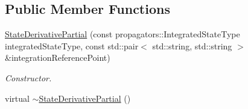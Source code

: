 \subsection*{Public Member Functions}
\begin{DoxyCompactItemize}
\item 
\hyperlink{classtudat_1_1orbit__determination_1_1StateDerivativePartial_a4827d172b38b466f65f4da68500f53ea}{State\+Derivative\+Partial} (const propagators\+::\+Integrated\+State\+Type integrated\+State\+Type, const std\+::pair$<$ std\+::string, std\+::string $>$ \&integration\+Reference\+Point)
\begin{DoxyCompactList}\small\item\em Constructor. \end{DoxyCompactList}\item 
virtual \hyperlink{classtudat_1_1orbit__determination_1_1StateDerivativePartial_a05f085a890b27518ca24446ac22bdb3e}{$\sim$\+State\+Derivative\+Partial} ()\hypertarget{classtudat_1_1orbit__determination_1_1StateDerivativePartial_a05f085a890b27518ca24446ac22bdb3e}{}\label{classtudat_1_1orbit__determination_1_1StateDerivativePartial_a05f085a890b27518ca24446ac22bdb3e}


\end{DoxyCompactItemize}
